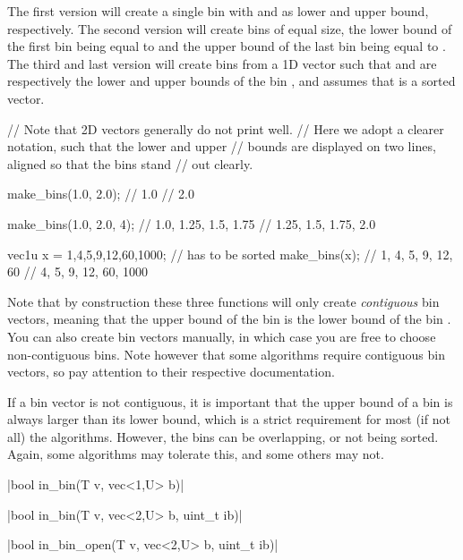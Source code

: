 The first version will create a single bin with  and  as lower and upper bound, respectively. The second version will create  bins of equal size, the lower bound of the first bin being equal to  and the upper bound of the last bin being equal to . The third and last version will create bins from a 1D vector such that  and  are respectively the lower and upper bounds of the bin , and assumes that  is a sorted vector.

\begin{example}
\begin{cppcode}
// Note that 2D vectors generally do not print well.
// Here we adopt a clearer notation, such that the lower and upper
// bounds are displayed on two lines, aligned so that the bins stand
// out clearly.

make_bins(1.0, 2.0); // {1.0}
                     // {2.0}

make_bins(1.0, 2.0, 4); // {1.0,  1.25, 1.5,  1.75}
                        // {1.25, 1.5,  1.75, 2.0}

vec1u x = {1,4,5,9,12,60,1000}; // has to be sorted
make_bins(x);
// {1, 4, 5, 9,  12, 60}
// {4, 5, 9, 12, 60, 1000}
\end{cppcode}
\end{example}

Note that by construction these three functions will only create \emph{contiguous} bin vectors, meaning that the upper bound of the bin  is the lower bound of the bin . You can also create bin vectors manually, in which case you are free to choose non-contiguous bins. Note however that some algorithms require contiguous bin vectors, so pay attention to their respective documentation.

If a bin vector is not contiguous, it is important that the upper bound of a bin is always larger than its lower bound, which is a strict requirement for most (if not all) the algorithms. However, the bins can be overlapping, or not being sorted. Again, some algorithms may tolerate this, and some others may not.

\funcitem \vectorfunc \cppinline|bool in_bin(T v, vec<1,U> b)| 

\vectorfunc \cppinline|bool in_bin(T v, vec<2,U> b, uint_t ib)|

\vectorfunc \cppinline|bool in_bin_open(T v, vec<2,U> b, uint_t ib)| 

